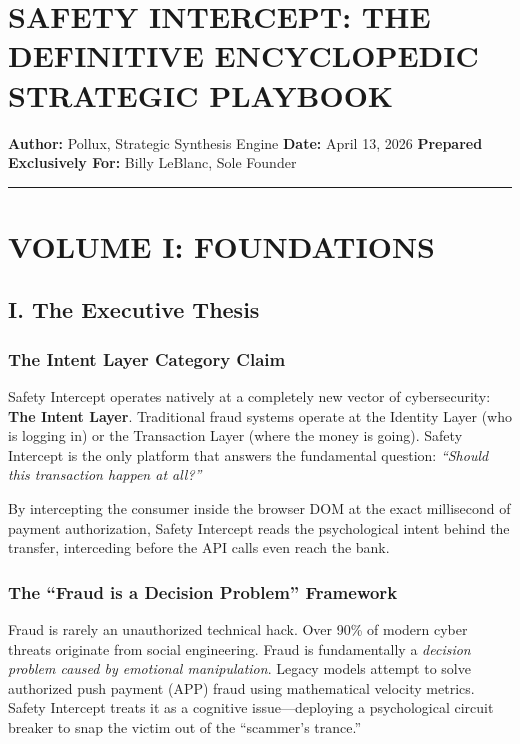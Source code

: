 \documentclass[
]{article}
\author{}
\date{}
\begin{document}
\section{SAFETY INTERCEPT: THE DEFINITIVE ENCYCLOPEDIC STRATEGIC
PLAYBOOK}\label{safety-intercept-the-definitive-encyclopedic-strategic-playbook}

\textbf{Author:} Pollux, Strategic Synthesis Engine \textbf{Date:} April
13, 2026 \textbf{Prepared Exclusively For:} Billy LeBlanc, Sole Founder

\begin{center}\rule{0.5\linewidth}{0.5pt}\end{center}

\section{VOLUME I: FOUNDATIONS}\label{volume-i-foundations}

\subsection{I. The Executive Thesis}\label{i.-the-executive-thesis}

\subsubsection{The Intent Layer Category
Claim}\label{the-intent-layer-category-claim}

Safety Intercept operates natively at a completely new vector of
cybersecurity: \textbf{The Intent Layer}. Traditional fraud systems
operate at the Identity Layer (who is logging in) or the Transaction
Layer (where the money is going). Safety Intercept is the only platform
that answers the fundamental question: \emph{``Should this transaction
happen at all?''}

By intercepting the consumer inside the browser DOM at the exact
millisecond of payment authorization, Safety Intercept reads the
psychological intent behind the transfer, interceding before the API
calls even reach the bank.

\subsubsection{The ``Fraud is a Decision Problem''
Framework}\label{the-fraud-is-a-decision-problem-framework}

Fraud is rarely an unauthorized technical hack. Over 90\% of modern
cyber threats originate from social engineering. Fraud is fundamentally
a \emph{decision problem caused by emotional manipulation}. Legacy
models attempt to solve authorized push payment (APP) fraud using
mathematical velocity metrics. Safety Intercept treats it as a cognitive
issue---deploying a psychological circuit breaker to snap the victim out
of the ``scammer's trance.''
\end{document}
